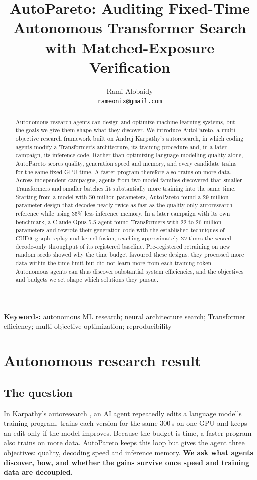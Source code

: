 \documentclass{article}
\title{AutoPareto: Auditing Fixed-Time Autonomous Transformer Search\\with Matched-Exposure Verification}
\author{Rami Alobaidy\\ \texttt{rameonix@gmail.com}}
\begin{document}
\maketitle
\begin{abstract}
Autonomous research agents can design and optimize machine learning systems, but the goals we give them shape what they discover. We introduce AutoPareto, a multi-objective research framework built on Andrej Karpathy's autoresearch, in which coding agents modify a Transformer's architecture, its training procedure and, in a later campaign, its inference code. Rather than optimizing language modelling quality alone, AutoPareto scores quality, generation speed and memory, and every candidate trains for the same fixed GPU time. A faster program therefore also trains on more data. Across independent campaigns, agents from two model families discovered that smaller Transformers and smaller batches fit substantially more training into the same time. Starting from a model with 50 million parameters, AutoPareto found a 29-million-parameter design that decodes nearly twice as fast as the quality-only autoresearch reference while using 35\% less inference memory. In a later campaign with its own benchmark, a Claude Opus 5.5 agent found Transformers with 22 to 26 million parameters and rewrote their generation code with the established techniques of CUDA graph replay and kernel fusion, reaching approximately 32 times the scored decode-only throughput of its registered baseline. Pre-registered retraining on new random seeds showed why the time budget favoured these designs: they processed more data within the time limit but did not learn more from each training token. Autonomous agents can thus discover substantial system efficiencies, and the objectives and budgets we set shape which solutions they pursue.
\end{abstract}

\noindent\textbf{Keywords:} autonomous ML research; neural architecture search; Transformer efficiency; multi-objective optimization; reproducibility

\section{Autonomous research result}\label{partone}

\subsection{The question}\label{sec:question}
 In Karpathy's autoresearch \citep{autoresearch}, an AI agent repeatedly edits a language model's training program, trains each version for the same 300\,s on one GPU and keeps an edit only if the model improves. Because the budget is time, a faster program also trains on more data. AutoPareto keeps this loop but gives the agent three objectives: quality, decoding speed and inference memory. \textbf{We ask what agents discover, how, and whether the gains survive once speed and training data are decoupled.}
\end{document}

